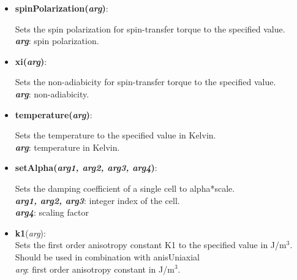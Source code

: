 \begin{itemize}
 \item {\vspace{-0.4cm}\textbf{spinPolarization(\textit{arg})}:
				\flushright\parbox{0.9 \textwidth}{\vspace{-0.25cm} 
				Sets the spin polarization for spin-transfer torque to the specified value.\\
				\textbf{\textit{arg}}: spin polarization.
				}\flushleft}

 \item {\vspace{-0.4cm}\textbf{xi(\textit{arg})}:
				\flushright\parbox{0.9 \textwidth}{\vspace{-0.25cm} 
				Sets the non-adiabicity for spin-transfer torque to the specified value.\\
				\textbf{\textit{arg}}: non-adiabicity.
				}\flushleft}

 \item {\vspace{-0.4cm}\textbf{temperature(\textit{arg})}:
				\flushright\parbox{0.9 \textwidth}{\vspace{-0.25cm} 
				Sets the temperature to the specified value in Kelvin.\\
				\textbf{\textit{arg}}: temperature in Kelvin.
				}\flushleft}

 \item {\vspace{-0.4cm}\textbf{setAlpha(\textit{arg1, arg2, arg3, arg4})}:
				\flushright\parbox{0.9 \textwidth}{\vspace{-0.25cm} 
				Sets the damping coefficient of a single cell to alpha*scale.\\
				\textbf{\textit{arg1, arg2, arg3}}: integer index of the cell.\\
				\textbf{\textit{arg4}}: scaling factor
				}\flushleft}

 \item \textbf{k1}(\textit{arg}):\\
				Sets the first order anisotropy constant K1 to the specified value in J/m$^3$.  Should be used in combination with anisUniaxial\\
				\textit{arg}: first order anisotropy constant in J/m$^3$.

\end{itemize}

